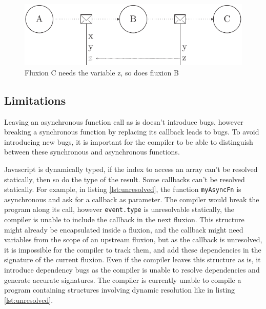 \begin{figure}[h!]
  \includegraphics[width=\linewidth]{ressources/streamline.pdf}
  \caption{Fluxion C needs the variable z, so does fluxion B}
  \label{fig:streamline}
\end{figure}

\subsection{Limitations} \label{ss:Limitations}

Leaving an asynchronous function call as is doesn't introduce bugs, however breaking a synchronous function by replacing its callback leads to bugs.
To avoid introducing new bugs, it is important for the compiler to be able to distinguish between these synchronous and asynchronous functions.



Javascript is dynamically typed, if the index to access an array can't be resolved statically, then so do the type of the result.
Some callbacks can't be resolved statically.
For example, in listing \ref{lst:unresolved}, the function \texttt{myAsyncFn} is asynchronous and ask for a callback as parameter.
The compiler would break the program along its call, however \texttt{event.type} is unresolvable statically, the compiler is unable to include the callback in the next fluxion.
This structure might already be encapsulated inside a fluxion, and the callback might need variables from the scope of an upstream fluxion, but as the callback is unresolved, it is impossible for the compiler to track them, and add these dependencies in the signature of the current fluxion.
Even if the compiler leaves this structure as is, it introduce dependency bugs as the compiler is unable to resolve dependencies and generate accurate signatures.
The compiler is currently unable to compile a program containing structures involving dynamic resolution like in listing \ref{lst:unresolved}.

